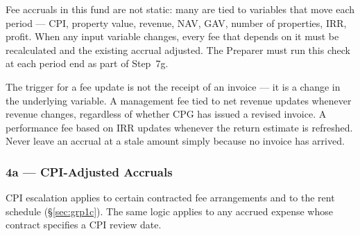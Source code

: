 \documentclass[10pt,a4paper]{article}
\begin{document}
Fee accruals in this fund are not static: many are tied to variables that move each period --- CPI, property value, revenue, NAV, GAV, number of properties, IRR, profit. When any input variable changes, every fee that depends on it must be recalculated and the existing accrual adjusted. The Preparer must run this check at each period end as part of Step~7g.

\begin{warning}
The trigger for a fee update is not the receipt of an invoice --- it is a change in the underlying variable. A management fee tied to net revenue updates whenever revenue changes, regardless of whether CPG has issued a revised invoice. A performance fee based on IRR updates whenever the return estimate is refreshed. Never leave an accrual at a stale amount simply because no invoice has arrived.
\end{warning}

\subsubsection{4a --- CPI-Adjusted Accruals}
\label{sec:grp4a}

CPI escalation applies to certain contracted fee arrangements and to the rent schedule (\S\ref{sec:grp1c}). The same logic applies to any accrued expense whose contract specifies a CPI review date.
\end{document}
